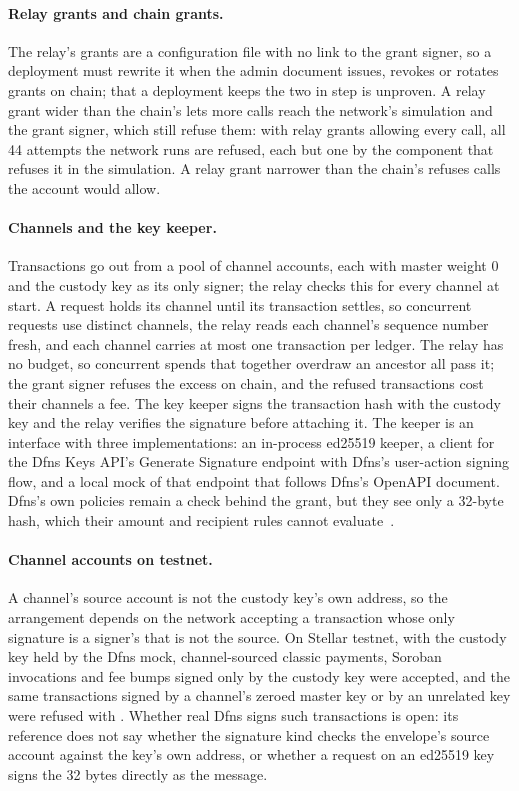 \paragraph{Relay grants and chain grants.} The relay's grants are a
configuration file with no link to the grant signer, so a deployment must
rewrite it when the admin document issues, revokes or rotates grants on chain;
that a deployment keeps the two in step is unproven.
A relay grant wider than the chain's lets more calls reach the network's
simulation and the grant signer, which still refuse them: with relay grants
allowing every call, all 44 attempts the network runs are
refused, each but one by the component that refuses
it in the simulation. A relay grant narrower than
the chain's refuses calls the account would allow.

\paragraph{Channels and the key keeper.} Transactions go out from a pool of
channel accounts, each with master weight 0 and the custody key as its only
signer; the relay checks this for every channel at start. A request holds its
channel until its transaction settles, so concurrent requests use distinct
channels, the relay reads each channel's sequence number fresh, and each
channel carries at most one transaction per ledger.
The relay has no budget, so concurrent spends that together overdraw an
ancestor all pass it; the grant signer refuses the excess on chain, and the
refused transactions cost their channels a fee. The key
keeper signs the transaction hash with the custody key and the relay verifies
the signature before attaching it. The keeper is an interface with three
implementations: an in-process ed25519 keeper, a client for the Dfns Keys
API's Generate Signature endpoint with Dfns's user-action signing flow, and a
local mock of that endpoint that follows Dfns's OpenAPI document. Dfns's own
policies remain a check behind the grant, but they see only a 32-byte hash,
which their amount and recipient rules cannot evaluate~\cite{dfnsSigningPolicies}.

\paragraph{Channel accounts on testnet.} A channel's source account is not the
custody key's own address, so the arrangement depends on the network accepting
a transaction whose only signature is a signer's that is not the source. On
Stellar testnet, with the custody key held by the Dfns mock, channel-sourced
classic payments, Soroban invocations and fee bumps signed only by the custody
key were accepted, and the same transactions signed by a channel's zeroed
master key or by an unrelated key were refused with
. Whether real Dfns signs such
transactions is open: its reference does not say whether the
 signature kind checks the envelope's source account against
the key's own address, or whether a
 request on an ed25519 key signs the 32 bytes directly as the
message.
